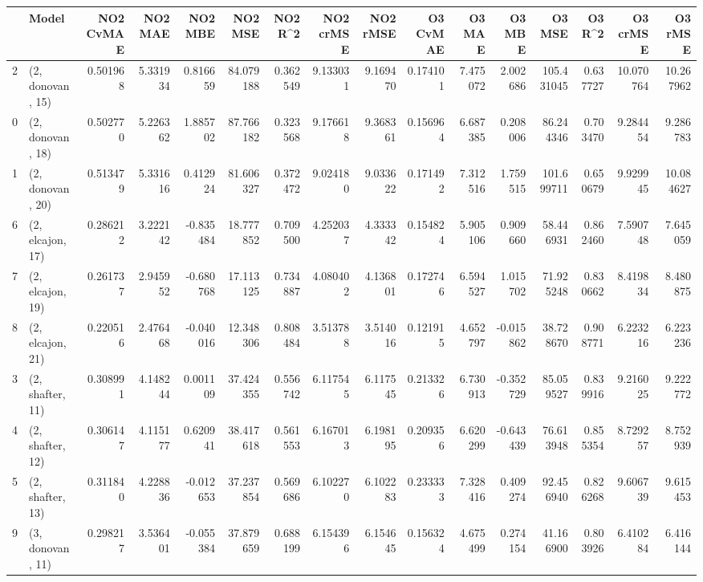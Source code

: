 \begin{tabular}{llrrrrrrrrrrrrrr}
\toprule
{} &             Model &  NO2 CvMAE &   NO2 MAE &   NO2 MBE &    NO2 MSE &   NO2 R\textasciicircum2 &  NO2 crMSE &  NO2 rMSE &  O3 CvMAE &    O3 MAE &    O3 MBE &      O3 MSE &    O3 R\textasciicircum2 &   O3 crMSE &    O3 rMSE \\
\midrule
2  &  (2, donovan, 15) &   0.501968 &  5.331934 &  0.816659 &  84.079188 &  0.362549 &   9.133031 &  9.169470 &  0.174101 &  7.475072 &  2.002686 &  105.431045 &  0.637727 &  10.070764 &  10.267962 \\
0  &  (2, donovan, 18) &   0.502770 &  5.226362 &  1.885702 &  87.766182 &  0.323568 &   9.176618 &  9.368361 &  0.156964 &  6.687385 &  0.208006 &   86.244346 &  0.703470 &   9.284454 &   9.286783 \\
1  &  (2, donovan, 20) &   0.513479 &  5.331616 &  0.412924 &  81.606327 &  0.372472 &   9.024180 &  9.033622 &  0.171492 &  7.312516 &  1.759515 &  101.699711 &  0.650679 &   9.929945 &  10.084627 \\
6  &  (2, elcajon, 17) &   0.286212 &  3.222142 & -0.835484 &  18.777852 &  0.709500 &   4.252037 &  4.333342 &  0.154824 &  5.905106 &  0.909660 &   58.446931 &  0.862460 &   7.590748 &   7.645059 \\
7  &  (2, elcajon, 19) &   0.261737 &  2.945952 & -0.680768 &  17.113125 &  0.734887 &   4.080402 &  4.136801 &  0.172746 &  6.594527 &  1.015702 &   71.925248 &  0.830662 &   8.419834 &   8.480875 \\
8  &  (2, elcajon, 21) &   0.220516 &  2.476468 & -0.040016 &  12.348306 &  0.808484 &   3.513788 &  3.514016 &  0.121915 &  4.652797 & -0.015862 &   38.728670 &  0.908771 &   6.223216 &   6.223236 \\
3  &  (2, shafter, 11) &   0.308991 &  4.148244 &  0.001109 &  37.424355 &  0.556742 &   6.117545 &  6.117545 &  0.213326 &  6.730913 & -0.352729 &   85.059527 &  0.839916 &   9.216025 &   9.222772 \\
4  &  (2, shafter, 12) &   0.306147 &  4.115177 &  0.620941 &  38.417618 &  0.561553 &   6.167013 &  6.198195 &  0.209356 &  6.620299 & -0.643439 &   76.613948 &  0.855354 &   8.729257 &   8.752939 \\
5  &  (2, shafter, 13) &   0.311840 &  4.228836 & -0.012653 &  37.237854 &  0.569686 &   6.102270 &  6.102283 &  0.233333 &  7.328416 &  0.409274 &   92.456940 &  0.826268 &   9.606739 &   9.615453 \\
9  &  (3, donovan, 11) &   0.298217 &  3.536401 & -0.055384 &  37.879659 &  0.688199 &   6.154396 &  6.154645 &  0.156324 &  4.675499 &  0.274154 &   41.166900 &  0.803926 &   6.410284 &   6.416144 \\

\end{tabular}
